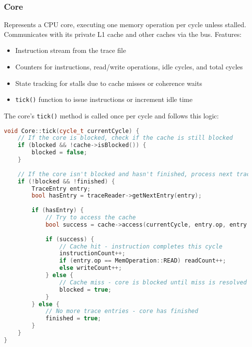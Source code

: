 \documentclass[11pt]{article}
\begin{document}
\subsubsection{Core}
Represents a CPU core, executing one memory operation per cycle unless stalled. Communicates with its private L1 cache and other caches via the bus. Features:
\begin{itemize}
    \item Instruction stream from the trace file
    \item Counters for instructions, read/write operations, idle cycles, and total cycles
    \item State tracking for stalls due to cache misses or coherence waits
    \item \texttt{tick()} function to issue instructions or increment idle time
\end{itemize}

The core's \texttt{tick()} method is called once per cycle and follows this logic:

\begin{lstlisting}[language=C++, caption=Core tick() Method (Simplified)]
void Core::tick(cycle_t currentCycle) {
    // If the core is blocked, check if the cache is still blocked
    if (blocked && !cache->isBlocked()) {
        blocked = false;
    }
    
    // If the core isn't blocked and hasn't finished, process next trace entry
    if (!blocked && !finished) {
        TraceEntry entry;
        bool hasEntry = traceReader->getNextEntry(entry);
        
        if (hasEntry) {
            // Try to access the cache
            bool success = cache->access(currentCycle, entry.op, entry.addr);
            
            if (success) {
                // Cache hit - instruction completes this cycle
                instructionCount++;
                if (entry.op == MemOperation::READ) readCount++;
                else writeCount++;
            } else {
                // Cache miss - core is blocked until miss is resolved
                blocked = true;
            }
        } else {
            // No more trace entries - core has finished
            finished = true;
        }
    }
}
\end{lstlisting}
\end{document}
